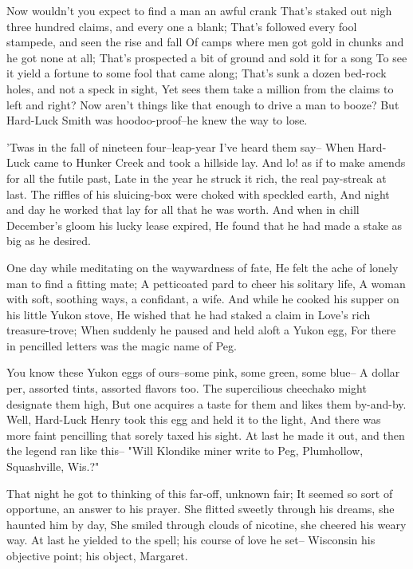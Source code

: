 
\begin{poemblock}
 Now wouldn't you expect to find a man an awful crank
 That's staked out nigh three hundred claims, and every one a blank;
 That's followed every fool stampede, and seen the rise and fall
 Of camps where men got gold in chunks and he got none at all;
 That's prospected a bit of ground and sold it for a song
 To see it yield a fortune to some fool that came along;
 That's sunk a dozen bed-rock holes, and not a speck in sight,
 Yet sees them take a million from the claims to left and right?
 Now aren't things like that enough to drive a man to booze?
 But Hard-Luck Smith was hoodoo-proof--he knew the way to lose.

 'Twas in the fall of nineteen four--leap-year I've heard them say--
 When Hard-Luck came to Hunker Creek and took a hillside lay.
 And lo! as if to make amends for all the futile past,
 Late in the year he struck it rich, the real pay-streak at last.
 The riffles of his sluicing-box were choked with speckled earth,
 And night and day he worked that lay for all that he was worth.
 And when in chill December's gloom his lucky lease expired,
 He found that he had made a stake as big as he desired.

 One day while meditating on the waywardness of fate,
 He felt the ache of lonely man to find a fitting mate;
 A petticoated pard to cheer his solitary life,
 A woman with soft, soothing ways, a confidant, a wife.
 And while he cooked his supper on his little Yukon stove,
 He wished that he had staked a claim in Love's rich treasure-trove;
 When suddenly he paused and held aloft a Yukon egg,
 For there in pencilled letters was the magic name of Peg.

 You know these Yukon eggs of ours--some pink, some green, some blue--
 A dollar per, assorted tints, assorted flavors too.
 The supercilious cheechako might designate them high,
 But one acquires a taste for them and likes them by-and-by.
 Well, Hard-Luck Henry took this egg and held it to the light,
 And there was more faint pencilling that sorely taxed his sight.
 At last he made it out, and then the legend ran like this--
 "Will Klondike miner write to Peg, Plumhollow, Squashville, Wis.?"

 That night he got to thinking of this far-off, unknown fair;
 It seemed so sort of opportune, an answer to his prayer.
 She flitted sweetly through his dreams, she haunted him by day,
 She smiled through clouds of nicotine, she cheered his weary way.
 At last he yielded to the spell; his course of love he set--
 Wisconsin his objective point; his object, Margaret.


\end{poemblock}
